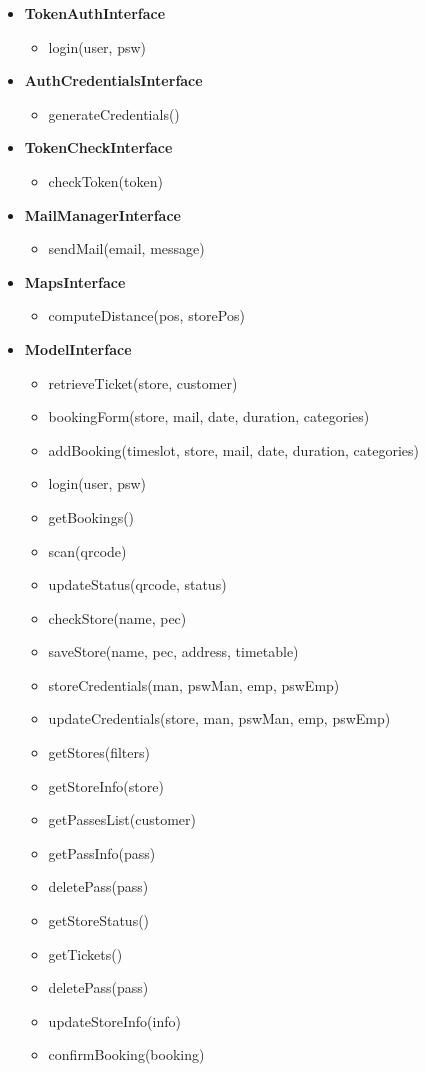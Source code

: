 \begin{itemize}
	\item \textbf{TokenAuthInterface}
	\begin{itemize}
		\item login(user, psw)
	\end{itemize}

	\item \textbf{AuthCredentialsInterface}
	\begin{itemize}
		\item generateCredentials()
	\end{itemize}

	\item \textbf{TokenCheckInterface}
	\begin{itemize}
		\item checkToken(token)
	\end{itemize}

	\clearpage

	\item \textbf{MailManagerInterface}
	\begin{itemize}
		\item sendMail(email, message)
	\end{itemize}

	\item \textbf{MapsInterface}
	\begin{itemize}
		\item computeDistance(pos, storePos)
	\end{itemize}

	\item \textbf{ModelInterface}
	\begin{itemize}
		\item retrieveTicket(store, customer)
		\item bookingForm(store, mail, date, duration, categories)
		\item addBooking(timeslot, store, mail, date, duration, categories)
		\item login(user, psw)
		\item getBookings()
		\item scan(qrcode)
		\item updateStatus(qrcode, status)
		\item checkStore(name, pec)
		\item saveStore(name, pec, address, timetable)
		\item storeCredentials(man, pswMan, emp, pswEmp)
		\item updateCredentials(store, man, pswMan, emp, pswEmp)
		\item getStores(filters)
		\item getStoreInfo(store)
		\item getPassesList(customer)
		\item getPassInfo(pass)
		\item deletePass(pass)
		\item getStoreStatus()
		\item getTickets()
		\item deletePass(pass)
		\item updateStoreInfo(info)
		\item confirmBooking(booking)
	\end{itemize}


\end{itemize}
